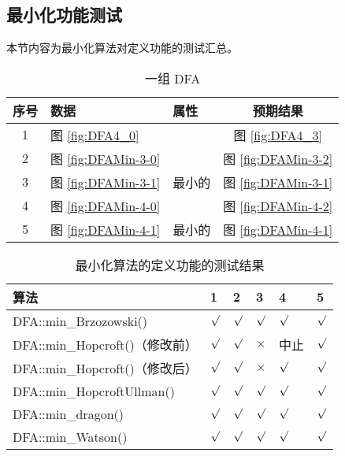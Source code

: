 \subsection{最小化功能测试}

本节内容为最小化算法对定义功能的测试汇总。

\begin{table}[!htbp]
    \caption{一组 DFA}
    \label{tab:MinData}
    \centering
    \small%
    \setlength{\tabcolsep}{4pt}%
    \renewcommand{\arraystretch}{1.2}%
    \begin{tabular}{c p{4em}<{\centering} p{4em}<{\centering} c }  %
        \toprule %
                序号  &  数据 & 属性 & 预期结果  \\
        \midrule%
        1 &  图 \ref{fig:DFA4_0} &            & 图 \ref{fig:DFA4_3}\\
        \midrule
        2 & 图 \ref{fig:DFAMin-3-0} &         & 图 \ref{fig:DFAMin-3-2}  \\
        3 & 图 \ref{fig:DFAMin-3-1} & 最小的  & 图 \ref{fig:DFAMin-3-1}  \\
        \midrule
        4 & 图 \ref{fig:DFAMin-4-0} &        & 图 \ref{fig:DFAMin-4-2}  \\
        5 & 图 \ref{fig:DFAMin-4-1} & 最小的  & 图 \ref{fig:DFAMin-4-1}  \\
        \bottomrule%
    \end{tabular}
\end{table}

\begin{table}[!htbp]
    \caption{ 最小化算法的定义功能的测试结果 }
    \label{tab:MinResult}
    \centering
    \small%
    \setlength{\tabcolsep}{4pt}%
    \renewcommand{\arraystretch}{1.2}%
    \begin{tabular}{l| p{3em}<{\centering} p{3em}<{\centering} p{3em}<{\centering} p{3em}<{\centering} p{3em}<{\centering} }  %
        \toprule %
        算法 & 1 & 2 & 3 & 4 &  5  \\
        \midrule
        DFA::min\_Brzozowski()        & $\surd$ & $\surd$ & $\surd$   & $\surd$     & $\surd$       \\
        DFA::min\_Hopcroft()（修改前） & $\surd$ & $\surd$ & $\times$  & 中止        & $\surd$       \\
        DFA::min\_Hopcroft()（修改后） & $\surd$ & $\surd$ & $\times$  & $\surd$     & $\surd$       \\
        DFA::min\_HopcroftUllman()    & $\surd$ & $\surd$ & $\surd$   & $\surd$     & $\surd$       \\
        DFA::min\_dragon()            & $\surd$ & $\surd$ & $\surd$   & $\surd$     & $\surd$       \\
        DFA::min\_Watson()            & $\surd$ & $\surd$ & $\surd$   & $\surd$     & $\surd$       \\
        \bottomrule%
    \end{tabular}
\end{table}

